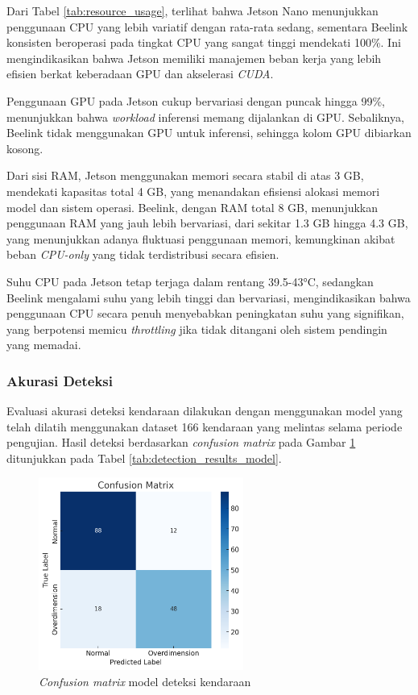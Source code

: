 Dari Tabel \ref{tab:resource_usage}, terlihat bahwa Jetson Nano menunjukkan penggunaan CPU yang lebih variatif dengan rata-rata sedang, sementara Beelink konsisten beroperasi pada tingkat CPU yang sangat tinggi mendekati 100\%. Ini mengindikasikan bahwa Jetson memiliki manajemen beban kerja yang lebih efisien berkat keberadaan GPU dan akselerasi \emph{CUDA}.

Penggunaan GPU pada Jetson cukup bervariasi dengan puncak hingga 99\%, menunjukkan bahwa \emph{workload} inferensi memang dijalankan di GPU. Sebaliknya, Beelink tidak menggunakan GPU untuk inferensi, sehingga kolom GPU dibiarkan kosong.

Dari sisi RAM, Jetson menggunakan memori secara stabil di atas 3 GB, mendekati kapasitas total 4 GB, yang menandakan efisiensi alokasi memori model dan sistem operasi. Beelink, dengan RAM total 8 GB, menunjukkan penggunaan RAM yang jauh lebih bervariasi, dari sekitar 1.3 GB hingga 4.3 GB, yang menunjukkan adanya fluktuasi penggunaan memori, kemungkinan akibat beban \emph{CPU-only} yang tidak terdistribusi secara efisien.

Suhu CPU pada Jetson tetap terjaga dalam rentang 39.5-43°C, sedangkan Beelink mengalami suhu yang lebih tinggi dan bervariasi, mengindikasikan bahwa penggunaan CPU secara penuh menyebabkan peningkatan suhu yang signifikan, yang berpotensi memicu \emph{throttling} jika tidak ditangani oleh sistem pendingin yang memadai.


\subsubsection{Akurasi Deteksi}

Evaluasi akurasi deteksi kendaraan dilakukan dengan menggunakan model yang telah dilatih menggunakan dataset 166 kendaraan yang melintas selama periode pengujian. Hasil deteksi berdasarkan \emph{confusion matrix} pada Gambar \ref{fig:confusion_matrix_model} ditunjukkan pada Tabel \ref{tab:detection_results_model}.

\begin{figure}[htbp]
  \centering
  \includegraphics[width=0.6\textwidth]{gambar/bab4-confusion-matrix.png}
  \caption{\emph{Confusion matrix} model deteksi kendaraan}
  \label{fig:confusion_matrix_model}
\end{figure}

